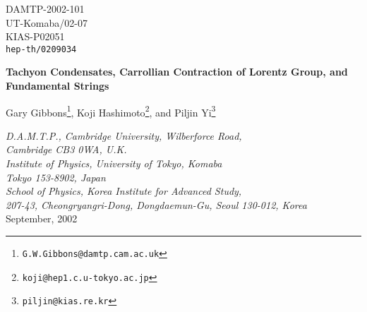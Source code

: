 \documentclass[a4paper,12pt]{article}
\begin{document}
\begin{titlepage}
\vfill
\begin{flushright}
{\normalsize DAMTP-2002-101}\\
{\normalsize UT-Komaba/02-07}\\
{\normalsize KIAS-P02051}\\
{\normalsize\tt hep-th/0209034}

\end{flushright}

\vfill
\begin{center}
{\Large\bf
Tachyon Condensates, Carrollian Contraction of Lorentz Group,
and Fundamental Strings
}

\vskip 0.3in

{
\large
Gary Gibbons\coordHE{}\footnote{\tt G.W.Gibbons@damtp.cam.ac.uk},  
Koji Hashimoto\coordHE{}\footnote{\tt koji@hep1.c.u-tokyo.ac.jp},
and 
Piljin  Yi\coordHE{}\footnote{{\tt piljin@kias.re.kr}}
}

\vskip 0.15in


\coordHE{} {\it D.A.M.T.P., Cambridge University, Wilberforce Road,} \\
{\it Cambridge CB3 0WA,  U.K.}\\[3pt]
\coordHE{} {\it Institute of Physics, University of Tokyo, Komaba}\\
{\it Tokyo 153-8902, Japan}\\[3pt]
\coordHE{} {\it School of Physics, Korea Institute for Advanced Study,} \\
{\it 207-43, Cheongryangri-Dong, Dongdaemun-Gu, Seoul 130-012, Korea}
\\[0.3in]

{\normalsize September, 2002}    


\end{center}


\vfill

\begin{abstract}
\normalsize\noindent 
We study the  rolling tachyon condensate in the presence of a gauge
 field. The generic vacuum admits both a rolling tachyon, \coordHE{}, and
 a uniform electric  field, \coordHE{}, which together affect the
 effective metric governing the  fluctuations of open string modes. If
 one suppresses the gauge field altogether, the light-cone collapses
 completely. This is the Carrollian limit, with vanishing speed of light
 and no possible propagation of signals. In the presence of a gauge
 field,
 however, the lightcone is squeezed to the shape of a fan,  allowing
 propagation of signals along the direction of \coordHE{} at speed
\coordHE{}. This shows that there are perturbative degrees of freedom
 propagating along electric flux lines. Such causal behavior appears to
 be a very general feature of tachyon effective Lagrangian with runway
 potentials. We speculate on how this may be connected to appearance
 of fundamental strings.
\end{abstract}


\vfill

\end{titlepage}
\end{document}
